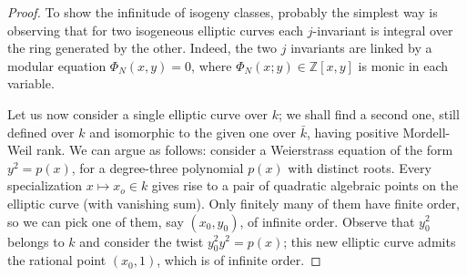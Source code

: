 \documentclass[leqno,12pt]{article} %
\def\Z{{{\mathbb Z}}}
\theoremstyle{plain} %
\theoremstyle{definition} %
\begin{document}
\begin{proof}
To show the infinitude of isogeny classes, probably the simplest way is observing that for two isogeneous elliptic curves each $j$-invariant is integral over the ring generated by the other. Indeed, the two $j$ invariants are linked by a modular equation $\Phi_N(x,y)=0$, where $\Phi_N(x;y)\in\Z[x,y]$ is monic in each variable.   


Let us now consider a single elliptic curve over $k$; we shall find a second one, still defined over $k$ and isomorphic to the given one over $\bar{k}$, having positive Mordell-Weil rank. We can argue as follows: consider a Weierstrass equation of the form
$y^2=p(x)$, for a degree-three polynomial $p(x)$ with distinct roots. Every specialization $x\mapsto x_o\in k$ gives rise to a pair of  quadratic algebraic points on the elliptic curve (with vanishing sum). Only finitely many of them have finite order, so we can pick one of them, say $(x_0,y_0)$, of infinite order. Observe that $y_0^2$ belongs to $k$ and consider the twist $y_0^2 y^2=p(x)$; this new elliptic curve admits the rational point $(x_0,1)$, which is of infinite order. 
\end{proof}
\smallskip
\end{document}
